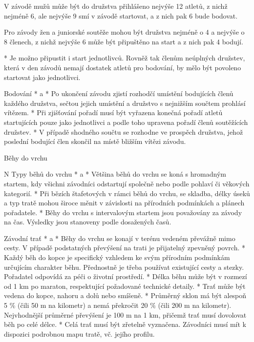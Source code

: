 V závodě mužů může být do družstva přihlášeno nejvýše 12 atletů, z nichž nejméně 6, ale nejvýše 9 smí v závodě startovat, a z nich pak 6 bude bodovat.

Pro závody žen a juniorské soutěže mohou být družstva nejméně o 4 a nejvýše o 8 členech, z nichž nejvýše 6 může být připuštěno na start a z nich pak 4 bodují.

* Je možno připustit i start jednotlivců. Rovněž tak členům neúplných družstev, která v den závodů nemají dostatek atletů pro bodování, by mělo být povoleno startovat jako jednotlivci.

Bodování
* \begitems \style a
  * Po ukončení závodu zjistí rozhodčí umístění bodujících členů každého družstva, sečtou jejich umístění a družstvo s nejnižším součtem prohlásí vítězem.
  * Při zjišťování pořadí musí být vyřazena konečná pořadí atletů startujících pouze jako jednotlivci a podle toho upravena pořadí členů soutěžících družstev.
  * V případě shodného součtu se rozhodne ve prospěch družstva, jehož poslední bodující člen skončil na místě bližším vítězi závodu.
  \enditems
\enditems

\secc Běhy do vrchu

\begitems \style N
Typy běhů do vrchu
* \begitems \style a
  * Většina běhů do vrchu se koná s hromadným startem, kdy všichni závodníci odstartují společně nebo podle pohlaví či věkových kategorií.
  * Při bězích štafetových v rámci běhů do vrchu, se skladba, délky úseků a typ tratě mohou široce měnit v závislosti na přírodních podmínkách a plánech pořadatele.
  * Běhy do vrchu s intervalovým startem jsou považovány za závody na čas. Výsledky jsou stanoveny podle dosažených časů.
  \enditems

Závodní trať
* \begitems \style a
  * Běhy do vrchu se konají v terénu vedeném převážně mimo cesty. V případě podstatných převýšení na trati je přijatelný zpevněný povrch.
  * Každý běh do kopce je specifický vzhledem ke svým přírodním podmínkám určujícím charakter běhu. Přednostně je třeba používat existující cesty a stezky. Pořadatel odpovídá za péči o životní prostředí.
  * Délka běhu může být v rozmezí od 1 km po maraton, respektující požadované technické detaily.
  * Trať může být vedena do kopce, nahoru a dolů nebo smíšeně.
  * Průměrný sklon má být alespoň 5 \% (čili 50 m na kilometr) a nemá překročit 20 \% (čili 200 m na kilometr). Nejvhodnější průměrné převýšení je 100 m na 1 km, přičemž trať musí dovolovat běh po celé délce.
  * Celá trať musí být zřetelně vyznačena. Závodníci musí mít k dispozici podrobnou mapu tratě, vč. jejího profilu.
  \enditems

